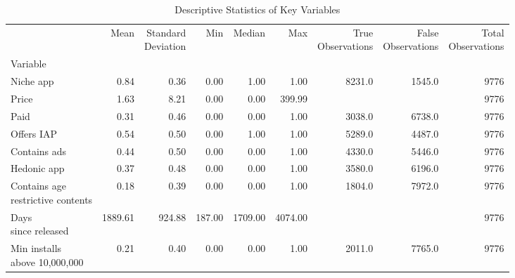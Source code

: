 \begin{table}[h!]
\centering
\caption{Descriptive Statistics of Key Variables}
\label{table:1}
\begin{tabular}{lrrrrrrrr}
\toprule
{} &      Mean &  \makecell[l]{Standard \\ Deviation} &     Min &   Median &          Max &  \makecell[l]{True \\ Observations} &  \makecell[l]{False \\ Observations} &  \makecell[l]{Total \\ Observations} \\
Variable                                                                  &           &                                      &         &          &              &                                     &                                      &                                      \\
\midrule
Niche app                                                                 &  0.84 &  0.36 &  0.00 &  1.00 &  1.00 &  8231.0 &  1545.0 &  9776 \\
Price                                                                     &  1.63 &  8.21 &  0.00 &  0.00 &  399.99 & {} & {} &  9776 \\
Paid                                                                      &  0.31 &  0.46 &  0.00 &  0.00 &  1.00 &  3038.0 &  6738.0 &  9776 \\
Offers IAP                                                                &  0.54 &  0.50 &  0.00 &  1.00 &  1.00 &  5289.0 &  4487.0 &  9776 \\
Contains ads                                                              &  0.44 &  0.50 &  0.00 &  0.00 &  1.00 &  4330.0 &  5446.0 &  9776 \\
Hedonic app                                                               &  0.37 &  0.48 &  0.00 &  0.00 &  1.00 &  3580.0 &  6196.0 &  9776 \\
\makecell[l]{Contains age \\ restrictive contents}                        &  0.18 &  0.39 &  0.00 &  0.00 &  1.00 &  1804.0 &  7972.0 &  9776 \\
\makecell[l]{Days \\ since released}                                      &  1889.61 &  924.88 &  187.00 &  1709.00 &  4074.00 & {} & {} &  9776 \\
\makecell[l]{Min installs \\ above 10,000,000}                            &  0.21 &  0.40 &  0.00 &  0.00 &  1.00 &  2011.0 &  7765.0 &  9776 \\

\end{tabular}
\end{table}
